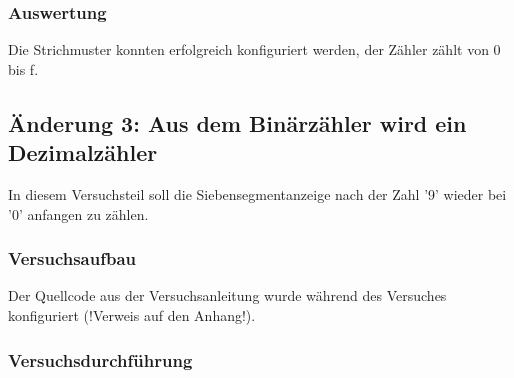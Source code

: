 \documentclass[12pt,a4paper]{article}
\begin{document}
\subsubsection*{Auswertung}
Die Strichmuster konnten erfolgreich konfiguriert werden, der Zähler zählt von 0 bis f.
\subsection{Änderung 3: Aus dem Binärzähler wird ein Dezimalzähler}
In diesem Versuchsteil soll die Siebensegmentanzeige nach der Zahl '9' wieder bei '0' anfangen zu zählen.
\subsubsection*{Versuchsaufbau}
Der Quellcode aus der Versuchsanleitung wurde während des Versuches konfiguriert (!Verweis auf den Anhang!).
\subsubsection*{Versuchsdurchführung}
\end{document}
